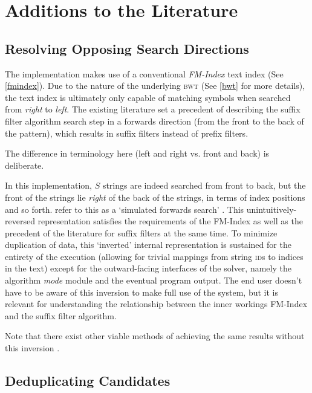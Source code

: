 \section{Additions to the Literature}

\subsection{Resolving Opposing Search Directions} \label{own_impl_search_dir}

The \aspop{} implementation makes use of a conventional \textit{FM-Index} \gls{text index} (See \ref{fmindex}). Due to the nature of the underlying \textsc{bwt} (See \ref{bwt} for more details), the text index is ultimately only capable of matching symbols when searched from \textit{right} to \textit{left}. The existing literature set a precedent of describing the \gls{suffix filter} algorithm \gls{search step} in a forwards direction (from the front to the back of the \gls{pattern}), which results in suffix filters instead of prefix filters.
 
The difference in terminology here (left and right vs. front and back) is deliberate.
 
In this \aspop{} implementation, $S$ strings are indeed searched from front to back, but the front of the strings lie \textit{right} of the back of the strings, in terms of index positions and so forth. \vali{} refer to this as a `simulated forwards search' \cite{vali2010}. This unintuitively-reversed representation satisfies the requirements of the FM-Index as well as the precedent of the literature for suffix filters at the same time. To minimize duplication of data, this `inverted' internal representation is sustained for the entirety of the execution (allowing for trivial mappings from string \textsc{id}s to indices in the text) except for the outward-facing interfaces of the solver, namely the algorithm \textit{mode} module and the eventual program output. The end user doesn’t have to be aware of this inversion to make full use of the system, but it is relevant for understanding the relationship between the inner workings FM-Index and the suffix filter algorithm.
 
Note that there exist other viable methods of achieving the same results without this inversion \cite{lam}.




\subsection{Deduplicating Candidates}
\label{impl:dedup}

